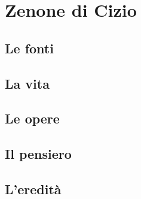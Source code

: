 \chapter{Zenone di Cizio}

\section{Le fonti}

\section{La vita}

\section{Le opere}

\section{Il pensiero}

\section{L'eredità}
